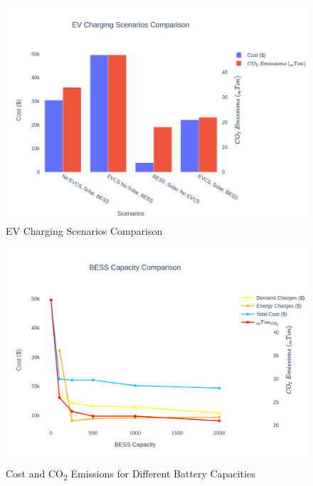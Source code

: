 \documentclass[conference]{IEEEtran}
\begin{document}
	\begin{figure}
		\centering
		\includegraphics[width=0.9\linewidth]{Fig/mg_scene_comparison}
		\caption{\footnotesize EV Charging Scenarios Comparison}
		\label{fig:mgscenecomparison}
	\end{figure}
	\begin{figure}
		\centering
		\includegraphics[width=0.9\linewidth]{Fig/bess_capacity_comparison}
		\caption{\footnotesize Cost and CO\textsubscript{2} Emissions for Different Battery Capacities}
		\label{fig:besscapacitycomparison}
	\end{figure}
\end{document}

